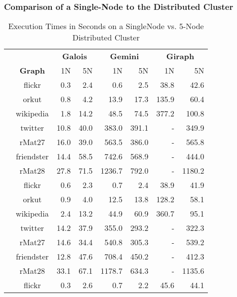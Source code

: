 





\subsubsection{Comparison of a Single-Node to the Distributed Cluster}
\begin{table}
	\caption{Execution Times in Seconds on a SingleNode vs. 5-Node Distributed Cluster}
	\label{tbl:execTimeComparison}
	\renewcommand{\arraystretch}{1.2}
	\centering
	\begin{tabular}{ccr@{\tabskip 1 \tabcolsep}r
	r@{\tabskip 1 \tabcolsep}r
	r@{\tabskip 1 \tabcolsep}r}
		\toprule
		&&\multicolumn{2}{c}{\bf Galois}&\multicolumn{2}{c}{\bf Gemini}&\multicolumn{2}{c}{\bf Giraph}\\
		\cmidrule{3-4}\cmidrule{5-6}\cmidrule{7-8}
		&\bf Graph&1N&5N&1N&5N&1N&5N\\
		\midrule
		\multirow{7}{0.5ex}{\rotatebox{90}{\bf SSSP}}&flickr & 0.3 & 2.4 & 0.6 & 2.5 & 38.8 & 42.6 \\
		& orkut & 0.8 & 4.2 & 13.9 & 17.3 & 135.9 & 60.4 \\
		& wikipedia & 1.8 & 14.2 & 48.5 & 74.5 & 377.2 & 100.8 \\
		& twitter & 10.8 & 40.0 & 383.0 & 391.1 & - & 349.9 \\
		& rMat27 & 16.0 & 39.0 & 563.5 & 386.0 & - & 565.8 \\
		& friendster & 14.4 & 58.5 & 742.6 & 568.9 & - & 444.0 \\
		& rMat28 & 27.8 & 71.5 & 1236.7 & 792.0 & - & 1180.2 \\
		\midrule
		\multirow{7}{0.5ex}{\rotatebox{90}{\bf BFS}}& flickr & 0.6 & 2.3 & 0.7 & 2.4 & 38.9 & 41.9 \\
		& orkut & 0.9 & 4.0 & 12.5 & 13.8 & 128.2 & 58.1 \\
		& wikipedia & 2.4 & 13.2 & 44.9 & 60.9 & 360.7 & 95.1 \\
		& twitter & 14.2 & 37.9 & 355.0 & 293.2 & - & 322.3 \\
		& rMat27 & 14.6 & 34.4 & 540.8 & 305.3 & - & 539.2 \\
		& friendster & 12.8 & 47.6 & 708.4 & 450.2 & - & 412.3 \\
		& rMat28 & 33.1 & 67.1 & 1178.7 & 634.3 & - & 1135.6 \\
		\midrule
		\multirow{7}{0.5ex}{\rotatebox{90}{\bf PR}}& flickr & 0.3\txtdagger & 2.6 & 0.7 & 2.2 & 45.6 & 44.1 \\

\end{tabular}
\end{table}
